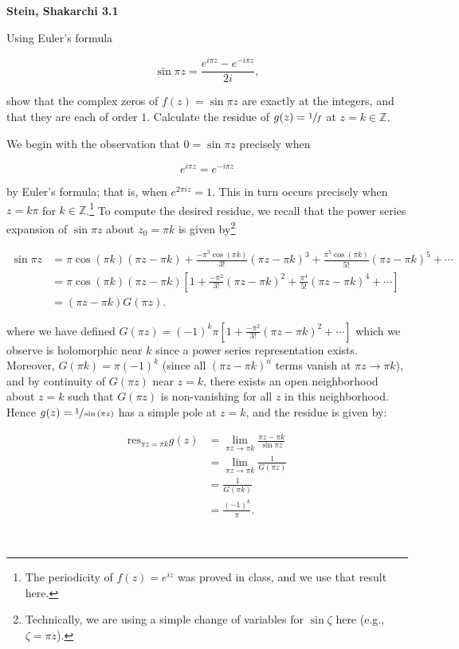 \textbf{Stein, Shakarchi 3.1}

Using Euler's formula

$$
\sin{\pi z} = \frac{e^{i \pi z} - e^{-i \pi z}}{2i},
$$

show that the complex zeros of $f(z) = \sin{\pi z}$ are exactly at the integers, and that they are each of order $1$. 
Calculate the residue of $g(z) = \sfrac{1}{f}$ at $z = k \in \mathbb{Z}$.

\begin{solution}
  We begin with the observation that $0 = \sin{\pi z}$ precisely when

  $$
  e^{i \pi z} = e^{-i \pi z}
  $$

  by Euler's formula; that is, when $e^{2 \pi i z } = 1$. This in turn occurs precisely when $z = k \pi$ for 
  $k \in \mathbb{Z}$.\footnote{
    The periodicity of $f(z) = e^{i z}$ was proved in class, and we use that result here.
  } To compute the desired residue, we recall that the power series expansion of $\sin{\pi z}$ about $z_0 = \pi k$ is 
  given by\footnote{
    Technically, we are using a simple change of variables for $\sin{\zeta}$ here (e.g., $\zeta = \pi z$).
  }

  \begin{align*}
    \sin{\pi z} &= \pi \cos(\pi k) (\pi z - \pi k) 
                 + \frac{-\pi^3\cos(\pi k)}{3!}(\pi z - \pi k)^3 
                 + \frac{\pi^5 \cos(\pi k)}{5!}(\pi z - \pi k)^5 +\cdots \\
                &= \pi \cos(\pi k) (\pi z - \pi k) \left[
                   1 
                   + \frac{-\pi^2}{3!}(\pi z - \pi k)^2
                   + \frac{\pi^4}{5!}(\pi z - \pi k)^4 +\cdots 
                 \right] \\
                &= (\pi z - \pi k) G(\pi z).
  \end{align*}

  where we have defined $G(\pi z) = (-1)^k \pi \left[1 + \frac{-\pi^2}{3!}(\pi z - \pi k)^2 + \cdots\right]$ 
  which we observe is holomorphic near $k$ since a power series representation exists. Moreover, $G(\pi k) = \pi (-1)^k$ 
  (since all $(\pi z - \pi k)^n$ terms vanish at $\pi z \to \pi k$), and by continuity of $G(\pi z)$ near 
  $z = k$, there exists an open neighborhood about $z = k$ such that $G(\pi z)$ is non-vanishing for all $z$ in this
  neighborhood. Hence $g(z) = \sfrac{1}{\sin{(\pi z)}}$ has a simple pole at $z = k$, and the residue is given by:

  \begin{align*}
    \text{res}_{\pi z = \pi k} {g(z)} 
      &= \lim_{\pi z \to \pi k} \frac{\pi z - \pi k}{\sin{\pi z}} \\
      &= \lim_{\pi z \to \pi k} \frac{1}{G(\pi z)} \\
      &= \frac{1}{G(\pi k)} \\
      &= \frac{(-1)^k}{\pi}.
  \end{align*}

  \ \\
\end{solution}